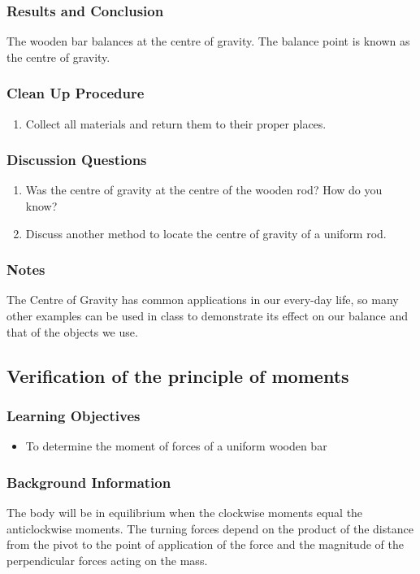 \subsubsection*{Results and Conclusion}
The wooden bar balances at the centre of gravity. The balance point is known as the centre of gravity.  

\subsubsection*{Clean Up Procedure}
\begin{enumerate}
\item{Collect all materials and return them to their proper places.} 
\end{enumerate}

\subsubsection*{Discussion Questions}
\begin{enumerate}
\item{Was the centre of gravity at the centre of the wooden rod? How do you know?}
\item{Discuss another method to locate the centre of gravity of a uniform rod.} 
\end{enumerate}

\subsubsection*{Notes}
The Centre of Gravity has common applications in our every-day life, so many other examples can be used in class to demonstrate its effect on our balance and that of the objects we use.  


\subsection{Verification of the principle of moments}

\subsubsection*{Learning Objectives}
\begin{itemize}
\item{To determine the moment of forces of a uniform wooden bar}
\end{itemize}

\subsubsection*{Background Information}
The body will be in equilibrium when the clockwise moments equal the anticlockwise moments. The turning forces depend on the product of the distance from the pivot to the point of application of the force and the magnitude of the perpendicular forces acting on the mass.  

